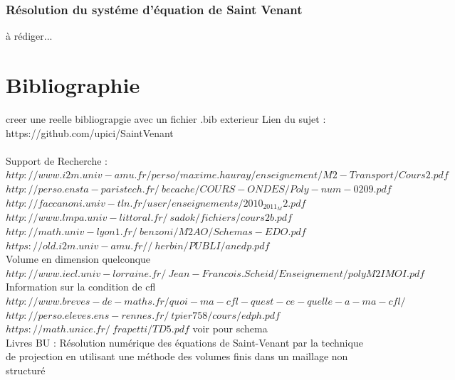 \documentclass[12pt]{article}
\begin{document}
\subsubsection{Résolution du systéme d'équation de Saint Venant}
à rédiger...

\section{Bibliographie}
creer une reelle bibliograpgie avec un fichier .bib exterieur
\noindent Lien du sujet : https://github.com/upici/SaintVenant
\\
\\Support de Recherche : $http://www.i2m.univ-amu.fr/perso/maxime.hauray/enseignement/M2-Transport/Cours2.pdf$
\\$http://perso.ensta-paristech.fr/~becache/COURS-ONDES/Poly-num-0209.pdf$
\\$http://faccanoni.univ-tln.fr/user/enseignements/2010_2011_M2.pdf$
\\$http://www.lmpa.univ-littoral.fr/~sadok/fichiers/cours2b.pdf$
\\$http://math.univ-lyon1.fr/~benzoni/M2AO/Schemas-EDO.pdf$
\\$https://old.i2m.univ-amu.fr//~herbin/PUBLI/anedp.pdf$
\\Volume en dimension quelconque
\\$http://www.iecl.univ-lorraine.fr/~Jean-Francois.Scheid/Enseignement/polyM2IMOI.pdf$
\\Information sur la condition de cfl
\\$http://www.breves-de-maths.fr/quoi-ma-cfl-quest-ce-quelle-a-ma-cfl/$
\\$http://perso.eleves.ens-rennes.fr/~tpier758/cours/edph.pdf$
\\$https://math.unice.fr/~frapetti/TD5.pdf$ voir pour schema
\\Livres BU : Résolution numérique des équations de Saint-Venant par la technique de projection en utilisant une méthode des volumes finis dans un maillage non structuré 
\end{document}
